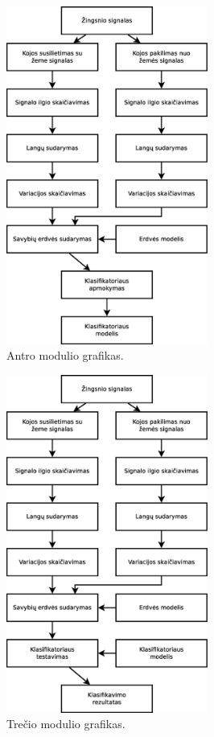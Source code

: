 \documentclass[]{vgtuef}
\begin{document}
\begin{figure}[!t]
  \centering
  \includegraphics[width=250px]{figures/antra_faze.eps}
  \caption{Antro modulio grafikas.}
  \label{fig:antra_faze}
\end{figure}

\begin{figure}[!t]
  \centering
  \includegraphics[width=250px]{figures/trecia_faze.eps}
  \caption{Trečio modulio grafikas.}
  \label{fig:trecia_faze}
\end{figure}
\end{document}
